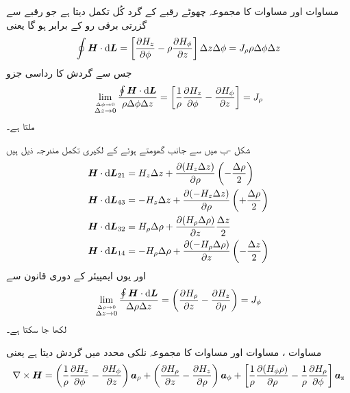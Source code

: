 مساوات  اور مساوات  کا مجموعہ چھوٹے رقبے کے گرد کُل تکمل دیتا ہے جو رقبے سے گزرتی برقی رو  کے برابر ہو گا یعنی
\begin{align*}
\oint \kvec{H} \cdot \dif \kvec{L}=\left[ \frac{\partial H_z}{\partial \phi}-\rho\frac{\partial H_{\phi}}{\partial z} \right]\Delta z\Delta \phi=J_{\rho} \rho \Delta \phi \Delta z
\end{align*}
جس سے گردش کا رداسی جزو
\begin{align}\label{مساوات_مقناطیسی_رداسی_نلکی_گردش}
\lim_{\overset{\Delta \phi \to 0}{\Delta z \to 0}}\frac{\oint \kvec{H} \cdot \dif \kvec{L}}{\rho \Delta \phi \Delta z}=\left[\frac{1}{\rho}\frac{\partial H_z}{\partial \phi} -\frac{\partial H_{\phi}}{\partial z}\right]=J_{\rho}
\end{align}
ملتا ہے۔

شکل -ب میں  سے  جانب گھومتے ہوئے   کے لکیری تکمل مندرجہ ذیل ہیں
\begin{align*}
\kvec{H} \cdot \dif \kvec{L}_{21}&=H_z \Delta z+\frac{\partial (H_z \Delta z)}{\partial \rho}\left(-\frac{\Delta \rho}{2}\right)\\
\kvec{H} \cdot \dif \kvec{L}_{43}&=-H_z \Delta z+\frac{\partial (-H_z \Delta z)}{\partial \rho}\left(+\frac{\Delta \rho}{2}\right)\\
\kvec{H} \cdot \dif \kvec{L}_{32}&=H_{\rho}\Delta \rho+\frac{\partial (H_{\rho}\Delta \rho)}{\partial  z}\frac{\Delta z}{2}\\
\kvec{H} \cdot \dif \kvec{L}_{14}&=-H_{\rho}\Delta \rho+\frac{\partial (-H_{\rho}\Delta \rho)}{\partial z}\left(-\frac{\Delta z}{2}\right)
\end{align*}
اور یوں ایمپیئر کے دوری قانون سے
\begin{align}\label{مساوات_مقناطیسی_زاویائی_نلکی_گردش}
\lim_{\overset{\Delta \rho \to 0}{\Delta z \to 0}}\frac{\oint \kvec{H} \cdot \dif \kvec{L}}{\Delta \rho \Delta z}=\left(\frac{\partial H_\rho}{\partial z}-\frac{\partial H_z}{\partial \rho} \right)=J_{\phi}
\end{align}
لکھا جا سکتا ہے۔

مساوات ، مساوات  اور مساوات  کا مجموعہ نلکی محدد میں گردش دیتا ہے یعنی
\begin{align}\label{مساوات_مقناطیسی_نلکی_محدد_میں_گردش}
\nabla \times {\ensuremath{{\boldsymbol{H}}}}=\left(\frac{1}{\rho}\frac{\partial H_z}{\partial \phi} -\frac{\partial H_{\phi}}{\partial z}\right){\boldsymbol{a}}_{\rho}+\left(\frac{\partial H_\rho}{\partial z}-\frac{\partial H_z}{\partial \rho} \right){\boldsymbol{a}}_{\phi}+\left[\frac{1}{\rho}\frac{\partial (H_{\phi}\rho )}{\partial \rho}-\frac{1}{\rho}\frac{\partial H_{\rho}}{\partial \phi}\right]{\boldsymbol{a}}_{\textup{z}}
\end{align}

